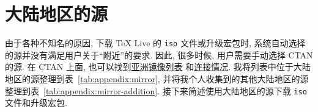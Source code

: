 
\chapter{大陆地区的源}\label{chp:appendix:mirror}

由于各种不知名的原因,
下载 \TeX{} Live 的 \texttt{iso} 文件或升级宏包时,
系统自动选择的源并没有满足用户关于``附近''的要求.
因此,
很多时候,
用户需要手动选择 CTAN 的源.
在 CTAN 上面,
也可以找到\href{https://ctan.org/mirrors#Asia}{亚洲镜像列表}%
和\href{https://ctan.org/mirrors/mirmon#cn}{连接情况}.
我将列表中位于大陆地区的源整理到表~\ref{tab:appendix:mirror},
并将我个人收集到的其他大陆地区的源整理到表~\ref{tab:appendix:mirror-addition}.
接下来简述使用大陆地区的源下载 \texttt{iso} 文件和升级宏包.

